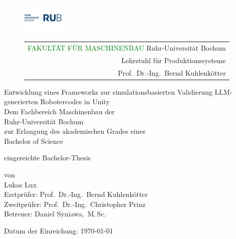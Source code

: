 \begin{titlepage}

  \begin{figure}[!htb]
    \begin{minipage}{.5\linewidth}
      \includegraphics[height=1.5cm]{Figures/RUB-Logo-blau.png}
    \end{minipage}
    \begin{minipage}{.5\linewidth}
      \begin{tabular}[m]{r}
        \textcolor{green}{FAKULTÄT FÜR MASCHINENBAU}
        Ruhr-Universität Bochum \\
        Lehrstuhl für Produktionssysteme \\
        Prof.~Dr.-Ing.~Bernd Kuhlenkötter \\
      \end{tabular}
    \end{minipage}
  \end{figure}
  \begin{center}
    \Huge
    Entwicklung eines Frameworks zur simulationsbasierten Validierung
    LLM-generierten Robotercodes in Unity \\ %
    \vspace{1.5cm}
    \large
    Dem Fachbereich Maschinenbau der \\
    Ruhr-Universität Bochum \\
    zur Erlangung des akademischen Grades eines \\
    Bachelor of Science

    \vspace{1cm}
    eingereichte Bachelor-Thesis

    \vspace{1cm}
    von\\
    Lukas Lux \\

    \vspace{1.5cm}
    Erstprüfer: Prof.~Dr.-Ing.~Bernd Kuhlenkötter \\
    Zweitprüfer: Prof.~Dr.-Ing.~Christopher Prinz \\
    Betreuer: Daniel Syniawa,~M.\,Sc.

    \vspace{1cm}
    Datum der Einreichung: \today
  \end{center}
\end{titlepage}
